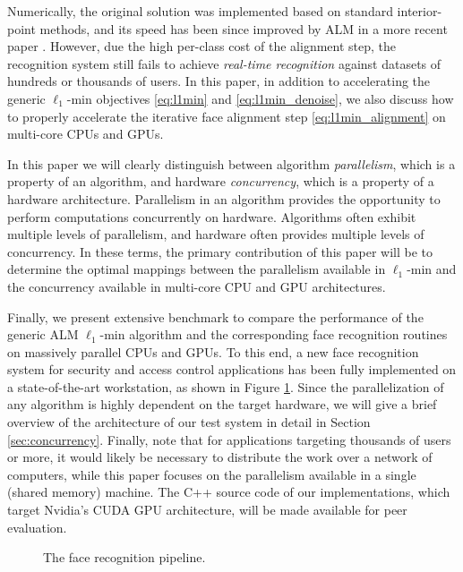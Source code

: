 \documentclass[10pt,twocolumn,letterpaper]{article}
\begin{document}
Numerically, the original solution \cite{WagnerA2009-CVPR} was implemented based 
on standard interior-point methods, and its speed has been since improved by ALM in a more recent paper
\cite{WagnerA2011-PAMI}. However, due the high per-class cost
of the alignment step, the recognition system still fails to achieve \emph{real-time recognition} against datasets of hundreds or thousands of users.
In this paper, in addition to accelerating the generic
$\ell_1$-min objectives \eqref{eq:l1min} and \eqref{eq:l1min_denoise}, we 
also discuss how to properly accelerate the iterative face alignment step
\eqref{eq:l1min_alignment} on multi-core CPUs and GPUs.

In this paper we will clearly distinguish between algorithm {\em parallelism},
which is a property of an algorithm, and hardware {\em concurrency}, which is a
property of a hardware architecture. Parallelism in an algorithm provides the
opportunity to perform computations concurrently on hardware.  Algorithms often
exhibit multiple levels of parallelism, and hardware often provides multiple
levels of concurrency.  In these terms, the primary contribution of this paper
will be to determine the optimal mappings between the parallelism available in
$\ell_1$-min and the concurrency available in multi-core CPU and GPU
architectures.

Finally, we present extensive benchmark to compare the performance of the
generic ALM $\ell_1$-min algorithm and the corresponding face recognition
routines on massively parallel CPUs and GPUs.  To this end, a new face
recognition system for security and access control applications has been fully implemented on a state-of-the-art
workstation, as shown in Figure \ref{fig:pipeline}. 
Since the parallelization of any algorithm
is highly dependent on the target hardware, we will give a brief overview of
the architecture of our test system in detail in Section
\ref{sec:concurrency}.
Finally, note that for applications targeting thousands of users or more, it would likely be
necessary to distribute the work over a network of computers, while this paper
focuses on the parallelism available in a single (shared memory) machine.
The C++ source code of our implementations, which target Nvidia's CUDA GPU architecture,
will be made available for peer evaluation.
\begin{figure}
\centering
{\tiny }
\caption{The face recognition pipeline.}
\label{fig:pipeline}
\end{figure}
\end{document}
